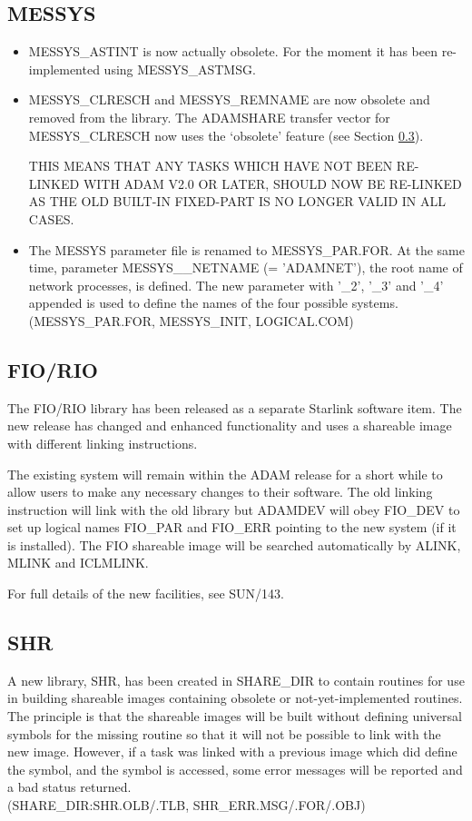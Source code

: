 \subsection{MESSYS}
\begin{itemize}
\item MESSYS\_ASTINT is now actually obsolete. For the moment it has been
re-implemented using MESSYS\-\_ASTMSG.
\item MESSYS\_CLRESCH and MESSYS\-\_REMNAME are now obsolete and removed from
the library. The ADAMSHARE transfer vector for MESSYS\-\_CLRESCH now uses the
`obsolete' feature (see Section \ref{shr}).

THIS MEANS THAT ANY TASKS WHICH HAVE NOT BEEN RE-LINKED WITH ADAM V2.0 OR
LATER, SHOULD NOW BE RE-LINKED AS THE OLD BUILT-IN FIXED-PART IS NO LONGER
VALID IN ALL CASES.
\item The MESSYS parameter file is renamed to MESSYS\_PAR.FOR. At the same
time,
parameter MESSYS\_\_NETNAME (= 'ADAMNET'), the root name of network processes,
is defined. The new parameter with '\_2', '\_3' and '\_4' appended is used
to define the names of the four possible systems.\\
(MESSYS\_PAR.FOR, MESSYS\_INIT, LOGICAL.COM)
\end{itemize}

\subsection{FIO/RIO}
The FIO/RIO library has been released as a separate Starlink software item.
The new release has changed and enhanced functionality and uses a shareable 
image with different linking instructions.

The existing system will remain within the ADAM release for a short while to 
allow users to make any necessary changes to their software. The old linking
instruction will link with the old library but ADAMDEV will obey FIO\_DEV to 
set up logical names FIO\_PAR and FIO\_ERR pointing to the new system (if it 
is installed).
The FIO shareable image will be searched automatically by ALINK, MLINK and
ICLMLINK.

For full details of the new facilities, see SUN/143.

\subsection{SHR}
\label{shr}
A new library, SHR,  has been created in SHARE\_DIR to contain routines 
for use in building shareable images containing obsolete or not-yet-implemented
routines. The principle is that the shareable images will be built without 
defining universal symbols for the missing routine so that it will not be 
possible to link with the new image. However, if a task was linked with a 
previous image which did define the symbol, and the symbol is accessed, some
error messages will be reported and a bad status returned.\\
(SHARE\_DIR:SHR.OLB/.TLB, SHR\_ERR.MSG/.FOR/.OBJ)

